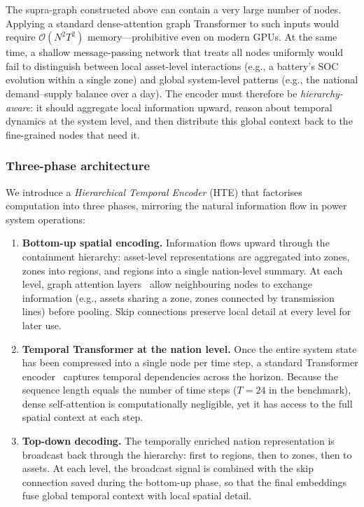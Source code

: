 \documentclass{article}
\begin{document}
The supra-graph constructed above can contain a very large number of nodes. Applying a standard dense-attention graph Transformer to such inputs would require $\mathcal{O}(N^2 T^2)$ memory---prohibitive even on modern GPUs. At the same time, a shallow message-passing network that treats all nodes uniformly would fail to distinguish between local asset-level interactions (e.g., a battery's SOC evolution within a single zone) and global system-level patterns (e.g., the national demand--supply balance over a day). The encoder must therefore be \emph{hierarchy-aware}: it should aggregate local information upward, reason about temporal dynamics at the system level, and then distribute this global context back to the fine-grained nodes that need it.

\subsubsection{Three-phase architecture}

We introduce a \emph{Hierarchical Temporal Encoder} (HTE) that factorises computation into three phases, mirroring the natural information flow in power system operations:

\begin{enumerate}[noitemsep]
  \item \textbf{Bottom-up spatial encoding.} Information flows upward through the containment hierarchy: asset-level representations are aggregated into zones, zones into regions, and regions into a single nation-level summary. At each level, graph attention layers~\citep{brody_how_2022} allow neighbouring nodes to exchange information (e.g., assets sharing a zone, zones connected by transmission lines) before pooling. Skip connections preserve local detail at every level for later use.

  \item \textbf{Temporal Transformer at the nation level.} Once the entire system state has been compressed into a single node per time step, a standard Transformer encoder~\citep{vaswani2017attention} captures temporal dependencies across the horizon. Because the sequence length equals the number of time steps ($T = 24$ in the benchmark), dense self-attention is computationally negligible, yet it has access to the full spatial context at each step.

  \item \textbf{Top-down decoding.} The temporally enriched nation representation is broadcast back through the hierarchy: first to regions, then to zones, then to assets. At each level, the broadcast signal is combined with the skip connection saved during the bottom-up phase, so that the final embeddings fuse global temporal context with local spatial detail.
\end{enumerate}
\end{document}
